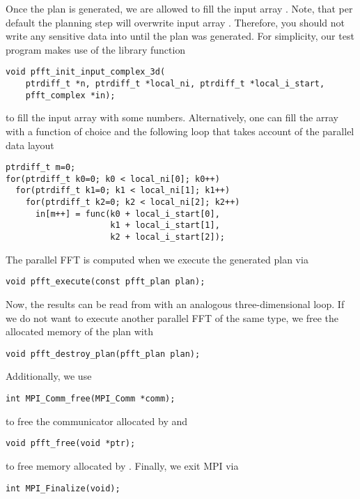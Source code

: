 Once the plan is generated, we are allowed to fill the input array . Note, that per default the planning step
 will overwrite input array . Therefore, you should not write any sensitive data into  until the plan was generated.
For simplicity, our test program makes use of the library function
\begin{lstlisting}
void pfft_init_input_complex_3d(
    ptrdiff_t *n, ptrdiff_t *local_ni, ptrdiff_t *local_i_start,
    pfft_complex *in);
\end{lstlisting}
to fill the input array with some numbers. Alternatively, one can fill the array with a function  of choice
and the following loop that takes account of the parallel data layout
\begin{lstlisting}
ptrdiff_t m=0;
for(ptrdiff_t k0=0; k0 < local_ni[0]; k0++)
  for(ptrdiff_t k1=0; k1 < local_ni[1]; k1++)
    for(ptrdiff_t k2=0; k2 < local_ni[2]; k2++)
      in[m++] = func(k0 + local_i_start[0],
                     k1 + local_i_start[1],
                     k2 + local_i_start[2]);
\end{lstlisting}
The parallel FFT is computed when we execute the generated plan via
\begin{lstlisting}
void pfft_execute(const pfft_plan plan);
\end{lstlisting}
Now, the results can be read from  with an analogous three-dimensional loop.
If we do not want to execute another parallel FFT of the same type, we free the allocated memory of the plan with
\begin{lstlisting}
void pfft_destroy_plan(pfft_plan plan);
\end{lstlisting}
Additionally, we use
\begin{lstlisting}
int MPI_Comm_free(MPI_Comm *comm);  
\end{lstlisting}
to free the communicator allocated by  and
\begin{lstlisting}
void pfft_free(void *ptr);
\end{lstlisting}
to free memory allocated by .
Finally, we exit MPI via
\begin{lstlisting}
int MPI_Finalize(void);
\end{lstlisting}


